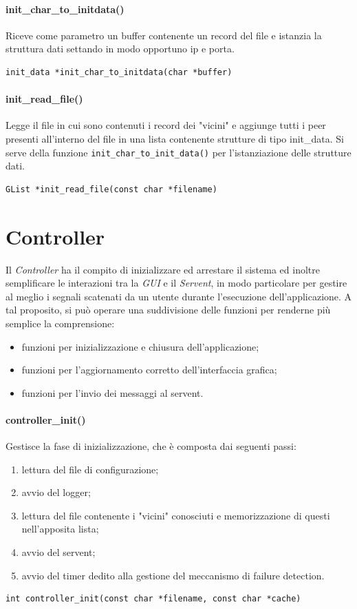 \paragraph{init\_char\_to\_initdata()}
Riceve come parametro un buffer contenente un record del file e istanzia la struttura dati settando in modo opportuno ip e porta.
\begin{lstlisting}
init_data *init_char_to_initdata(char *buffer)
\end{lstlisting}
\paragraph{init\_read\_file()}
Legge il file in cui sono contenuti i record dei "vicini" e aggiunge tutti i peer presenti all'interno del file in una lista contenente strutture di tipo init\_data. Si serve della funzione \texttt{init\_char\_to\_init\_data()} per l'istanziazione delle strutture dati.
\begin{lstlisting}
GList *init_read_file(const char *filename)
\end{lstlisting}

\section{Controller}
Il \textit{Controller} ha il compito di inizializzare ed arrestare il sistema ed inoltre semplificare le interazioni tra la \textit{GUI} e il \textit{Servent}, in modo particolare per gestire al meglio i segnali scatenati da un utente durante l'esecuzione dell'applicazione. A tal proposito, si può operare una suddivisione delle funzioni per renderne più semplice la comprensione:
\begin{itemize}
\item funzioni per inizializzazione e chiusura dell'applicazione;
\item funzioni per l'aggiornamento corretto dell'interfaccia grafica;
\item funzioni per l'invio dei messaggi al servent.
\end{itemize}
\paragraph{controller\_init()}
Gestisce la fase di inizializzazione, che è composta dai seguenti passi:
\begin{enumerate}
\item lettura del file di configurazione;
\item avvio del logger;
\item lettura del file contenente i "vicini" conosciuti e memorizzazione di questi nell'apposita lista;
\item avvio del servent;
\item avvio del timer dedito alla gestione del meccanismo di failure detection.
\end{enumerate}
\begin{lstlisting}
int controller_init(const char *filename, const char *cache)
\end{lstlisting}
